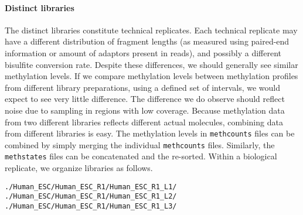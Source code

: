 \documentclass[10pt]{article}
\newcommand{\fn}[1]{\texttt{#1}}
\begin{document}
\paragraph{Distinct libraries}
The distinct libraries constitute technical replicates.  Each
technical replicate may have a different distribution of fragment
lengths (as measured using paired-end information or amount of
adaptors present in reads), and possibly a different bisulfite
conversion rate.  Despite these differences, we should generally see
similar methylation levels. If we compare methylation levels between
methylation profiles from different library preparations, using a
defined set of intervals, we would expect to see very little
difference. The difference we do observe should reflect noise due to
sampling in regions with low coverage.  Because methylation data from
two different libraries reflects different actual molecules, combining
data from different libraries is easy. The methylation levels in
\fn{methcounts} files can be combined by simply merging the individual
\fn{methcounts} files.  Similarly, the \fn{methstates} files can be
concatenated and the re-sorted. Within a biological replicate, we
organize libraries as follows.
\begin{verbatim}
./Human_ESC/Human_ESC_R1/Human_ESC_R1_L1/
./Human_ESC/Human_ESC_R1/Human_ESC_R1_L2/
./Human_ESC/Human_ESC_R1/Human_ESC_R1_L3/
\end{verbatim}
\end{document}
